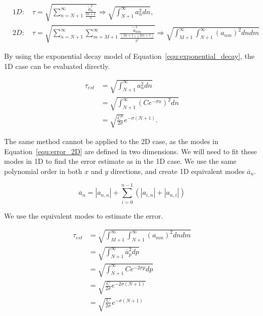 \begin{align}
	&1D: \quad \tau = \sqrt{\sum_{n = N + 1}^{\infty } \frac{\widetilde{a}_n^2}{\frac{2n + 1}{2}}} 
			   \Rightarrow \sqrt{\int_{N + 1}^{\infty } a_n^2 dn}, \label{equ:error_1D}
	\\
	&2D: \quad \tau = \sqrt{\sum_{n = N + 1}^{\infty }\sum_{m = M + 1}^{\infty}\frac{\widetilde{a}^2_{nm}}{\frac{(2n + 1)(2m + 1)}{2^2}}}
			   \Rightarrow \sqrt{\int_{M+1}^{\infty }\int_{N + 1 }^{\infty}(a_{nm})^2 dn dm} \label{equ:error_2D}
\end{align}

\noindent
By using the exponential decay model of Equation~\ref{equ:exponential_decay}, the 1D case can be
evaluated directly.

\begin{equation}
	\begin{aligned}
		\tau_{est} &= \sqrt{\int_{N + 1}^{\infty } a_n^2 dn} \\
		&= \sqrt{\int_{N + 1}^{\infty } \left( Ce^{-\sigma n} \right)^2 dn} \\
		&= \sqrt{\frac{C^2}{2\sigma }}e^{-\sigma (N + 1)}. 
	\end{aligned}
\end{equation}

The same method cannot be applied to the 2D case, as the modes in Equation~\ref{equ:error_2D} are
defined in two dimensions. We will need to fit these modes in 1D to find the error estimate as in
the 1D case. We use the same polynomial order in both $x$ and $y$ directions, and create 1D
equivalent modes $\overline{a}_n$. 

\begin{equation}
	\overline{a}_n = \left| a_{n,n} \right| + \sum_{i = 0}^{n-1} \left( \left| a_{i, n} \right| + \left| a_{n, i} \right| \right)
\end{equation}

\noindent
We use the equivalent modes to estimate the error.

\begin{equation}
	\begin{aligned}
		\tau_{est} &= \sqrt{\int_{M+1}^{\infty }\int_{N + 1 }^{\infty}(a_{nm})^2 dn dm} \\
		&= \sqrt{\int_{N + 1}^{\infty }\overline{a}_p^2 dp} \\
		&= \sqrt{\int_{N + 1}^{\infty} Ce^{-2\sigma p}dp} \\
		&= \sqrt{\frac{C}{2\sigma}e^{-2\sigma(N + 1)}} \\
		&= \sqrt{\frac{C}{2\sigma}} e^{-\sigma (N + 1)}
	\end{aligned}
\end{equation}

